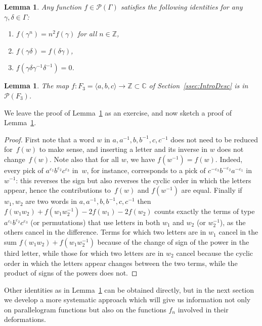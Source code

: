 \documentclass[JEP,XML,SOM,Unicode,NoEqCountersInSection]{cedram}
\let\mathcal\mathscr
\newtheorem{lemma}[theorem]{Lemma}
\theoremstyle{definition}
\newcommand{\ZZ}{\mathbb{Z}}
\newcommand{\CC}{\mathbb{C}}
\begin{document}
\begin{lemma}\label{lem:Elem}
Any function $f\!\in\!\mathcal{P}(\Gamma)$ satisfies the following
identities for any $\gamma,\delta\!\in\!\Gamma$:
\begin{enumerate}
\item $f(\gamma^n)=n^2f(\gamma)$ for all $n\in \ZZ$,
\item $f(\gamma\delta)=f(\delta\gamma)$,
\item $f(\gamma\delta\gamma^{-1}\delta^{-1})=0$.
\end{enumerate}
\end{lemma}
\begin{lemma}\label{lem:Premiere}
The map $f\colon F_3=\langle a,b,c\rangle\to\ZZ\subset\CC$
of Section~\ref{ssec:IntroDesc} is in $\mathcal{P}(F_3)$.
\end{lemma}
We leave the proof of Lemma~\ref{lem:Elem} as an exercise, and now sketch
a proof of Lemma~\ref{lem:Premiere}.
\begin{proof}
First note that a word $w$ in $a,a^{-1},b,b^{-1},c,c^{-1}$ does not need
to be reduced for~$f(w)$ to make sense, and inserting a letter and its inverse
in $w$ does not change~$f(w)$. Note also that for all $w$, we have
$f(w^{-1})=f(w)$. Indeed, every pick of
$a^{\varepsilon_1}b^{\varepsilon_2}c^{\varepsilon_3}$ in~$w$, for instance,
corresponds to a pick of $c^{-\varepsilon_3}b^{-\varepsilon_2}a^{-\varepsilon_1}$
in $w^{-1}$: this reverses the sign but also reverses the cyclic order in
which the letters appear, hence the contributions to~$f(w)$ and $f(w^{-1})$
are equal. Finally if $w_1,w_2$ are two words in $a,a^{-1},b,b^{-1},c,c^{-1}$
then $f(w_1w_2)+f(w_1w_2^{-1})-2f(w_1)-2f(w_2)$ counts exactly the
terms of type $a^{\varepsilon_1}b^{\varepsilon_2}c^{\varepsilon_3}$
(or permutations) that use letters in both $w_1$ and $w_2$ (or $w_2^{-1}$),
as the others cancel in the difference. Terms for which two letters are
in $w_1$ cancel in the sum $f(w_1w_2)+f(w_1w_2^{-1})$ because of the change
of sign of the power in the third letter, while those for which two letters
are in $w_2$ cancel because the cyclic order in which the letters appear
changes between the two terms, while the product of signs of the powers
does not.
\end{proof}

Other identities as in Lemma~\ref{lem:Elem} can be obtained directly,
but in the next section we develop a more systematic approach which
will give us information not only on parallelogram functions but also on the
functions $f_n$ involved in their deformations.
\end{document}
